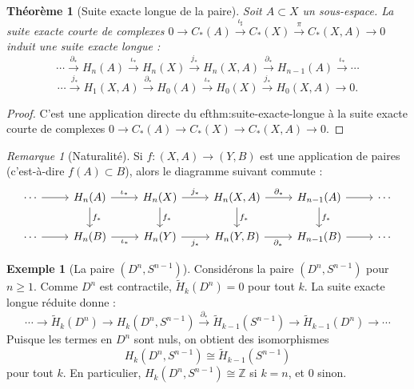\documentclass[12pt,a4paper,openany]{book}
\theoremstyle{definition}
\newtheorem{exemple}[definition]{Exemple}
\theoremstyle{plain}
\newtheorem{theoreme}[definition]{Théorème}
\theoremstyle{remark}
\newtheorem{remarque}[definition]{Remarque}
\newcommand{\Z}{\mathbb{Z}}
\begin{document}
\begin{theoreme}[Suite exacte longue de la paire]\label{thm:suite-exacte-paire}
Soit $A \subset X$ un sous-espace. La suite exacte courte de complexes
$0 \to C_*(A) \xrightarrow{\iota_\sharp} C_*(X) \xrightarrow{\pi} C_*(X,A) \to 0$
induit une suite exacte longue :
\[
  \cdots \xrightarrow{\partial_*} H_n(A) \xrightarrow{\iota_*} H_n(X) \xrightarrow{j_*} H_n(X,A) \xrightarrow{\partial_*} H_{n-1}(A) \xrightarrow{\iota_*} \cdots
\]
\[
  \cdots \xrightarrow{j_*} H_1(X,A) \xrightarrow{\partial_*} H_0(A) \xrightarrow{\iota_*} H_0(X) \xrightarrow{j_*} H_0(X,A) \to 0.
\]
\end{theoreme}

\begin{proof}
C'est une application directe du 
ef{thm:suite-exacte-longue} à la suite exacte courte de
complexes $0 \to C_*(A) \to C_*(X) \to C_*(X,A) \to 0$.
\end{proof}

\begin{remarque}[Naturalité]\label{rem:naturalite-paire}
Si $f \colon (X, A) \to (Y, B)$ est une application de paires (c'est-à-dire $f(A) \subset B$),
alors le diagramme suivant commute :
\[
\begin{tikzcd}
  \cdots \ar[r] & H_n(A) \ar[r, "\iota_*"] \ar[d, "f_*"] & H_n(X) \ar[r, "j_*"] \ar[d, "f_*"] & H_n(X,A) \ar[r, "\partial_*"] \ar[d, "f_*"] & H_{n-1}(A) \ar[r] \ar[d, "f_*"] & \cdots \\
  \cdots \ar[r] & H_n(B) \ar[r, "\iota_*"'] & H_n(Y) \ar[r, "j_*"'] & H_n(Y,B) \ar[r, "\partial_*"'] & H_{n-1}(B) \ar[r] & \cdots
\end{tikzcd}
\]
\end{remarque}

\begin{exemple}[La paire $(D^n, S^{n-1})$]\label{ex:paire-disque-sphere}
Considérons la paire $(D^n, S^{n-1})$ pour $n \geq 1$. Comme $D^n$ est contractile,
$\widetilde{H}_k(D^n) = 0$ pour tout $k$. La suite exacte longue réduite donne :
\[
  \cdots \to \widetilde{H}_k(D^n) \to H_k(D^n, S^{n-1}) \xrightarrow{\partial_*} \widetilde{H}_{k-1}(S^{n-1}) \to \widetilde{H}_{k-1}(D^n) \to \cdots
\]
Puisque les termes en $D^n$ sont nuls, on obtient des isomorphismes
\[
  H_k(D^n, S^{n-1}) \cong \widetilde{H}_{k-1}(S^{n-1})
\]
pour tout $k$. En particulier, $H_k(D^n, S^{n-1}) \cong \Z$ si $k = n$, et $0$ sinon.
\end{exemple}

\end{document}
